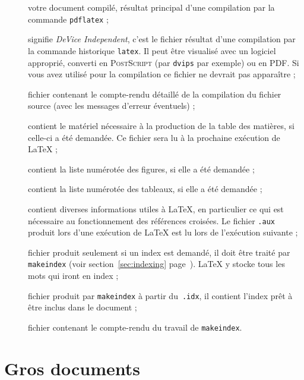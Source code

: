 \begin{description}
\item [] votre document compilé, résultat principal d'une
  compilation par la commande \texttt{pdflatex} ;
\item[] signifie \emph{DeVice Independent}, c'est le fichier
  résultat d'une compilation par la commande historique \texttt{latex}. Il peut
  être visualisé avec un logiciel approprié, converti en
  \textsc{PostScript} (par \texttt{dvips} par exemple) ou en PDF. Si
  vous avez utilisé  pour la compilation ce fichier
  ne devrait pas apparaître ;
\item[] fichier contenant le compte-rendu détaillé de la
  compilation du fichier source (avec les messages d'erreur
  éventuels) ;
\item[] contient le matériel nécessaire à la production de
  la table des matières, si celle-ci a été demandée. Ce fichier sera
  lu à la prochaine exécution de \LaTeX{} ;
\item[] contient la liste numérotée des figures, si elle a
  été demandée ;
\item[] contient la liste numérotée des tableaux, si elle a
  été demandée ;
\item[] contient diverses informations utiles à \LaTeX, en
  particulier ce qui est nécessaire au fonctionnement des références
  croisées. Le fichier \texttt{.aux} produit lors d'une exécution de
  \LaTeX{} est lu lors de l'exécution suivante ;
\item[] fichier produit seulement si un index est demandé,
  il doit être traité par \texttt{makeindex} (voir
  section~\ref{sec:indexing} page~\pageref{sec:indexing}). \LaTeX{} y
  stocke tous les mots qui iront en index ;
\item[] fichier produit par \texttt{makeindex} à partir
  du~\texttt{.idx}, il contient l'index prêt à être inclus dans le
  document ;
\item[] fichier contenant le compte-rendu du travail de
  \texttt{makeindex}.
\end{description}


%
%



%

\section{Gros documents}

